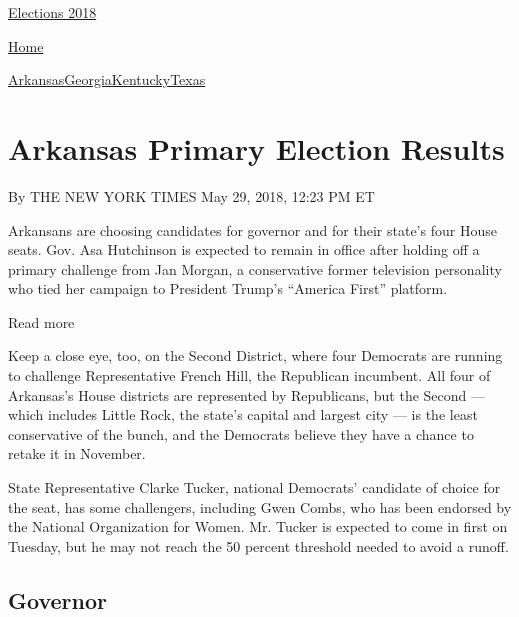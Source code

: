 \href{//www.nytimes3xbfgragh.onion}{}\href{https://www.nytimes3xbfgragh.onion/interactive/2018/us/elections/calendar-primary-results.html}{
Elections 2018}

\href{//www.nytimes3xbfgragh.onion}{ Home}

\href{https://www.nytimes3xbfgragh.onion/interactive/2018/05/22/us/elections/results-arkansas-primary-elections.html}{Arkansas}\href{https://www.nytimes3xbfgragh.onion/interactive/2018/05/22/us/elections/results-georgia-primary-elections.html}{Georgia}\href{https://www.nytimes3xbfgragh.onion/interactive/2018/05/22/us/elections/results-kentucky-primary-elections.html}{Kentucky}\href{https://www.nytimes3xbfgragh.onion/interactive/2018/05/22/us/elections/results-texas-primary-runoff-elections.html}{Texas}

\hypertarget{arkansas-primary-election-results}{%
\section{Arkansas Primary Election
Results}\label{arkansas-primary-election-results}}

By THE NEW YORK TIMES May 29, 2018, 12:23 PM ET

Arkansans are choosing candidates for governor and for their state's
four House seats. Gov. Asa Hutchinson is expected to remain in office
after holding off a primary challenge from Jan Morgan, a conservative
former television personality who tied her campaign to President Trump's
``America First'' platform.

Read more

Keep a close eye, too, on the Second District, where four Democrats are
running to challenge Representative French Hill, the Republican
incumbent. All four of Arkansas's House districts are represented by
Republicans, but the Second --- which includes Little Rock, the state's
capital and largest city --- is the least conservative of the bunch, and
the Democrats believe they have a chance to retake it in November.

State Representative Clarke Tucker, national Democrats' candidate of
choice for the seat, has some challengers, including Gwen Combs, who has
been endorsed by the National Organization for Women. Mr. Tucker is
expected to come in first on Tuesday, but he may not reach the 50
percent threshold needed to avoid a runoff.

\hypertarget{governor}{%
\subsection{Governor}\label{governor}}

